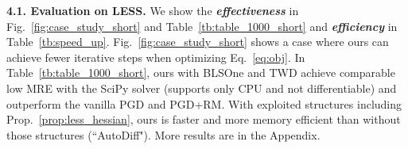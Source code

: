 \documentclass{article}
\newcommand{\textbt}[1]{\textbf{\textit{#1}}}
\theoremstyle{plain}
\theoremstyle{definition}
\theoremstyle{remark}
\begin{document}
\textbf{4.1. Evaluation on LESS.}
We show the \textbt{effectiveness} in Fig.~\ref{fig:case_study_short} and Table~\ref{tb:table_1000_short} and \textbt{efficiency} in Table~\ref{tb:speed_up}.
%
Fig.~\ref{fig:case_study_short} shows a case where ours can achieve fewer iterative steps when optimizing Eq.~\eqref{eq:obj}.
In Table~\ref{tb:table_1000_short}, ours with BLSOne and TWD achieve comparable low MRE with the SciPy solver \cite{scipy} (supports only CPU and not differentiable) and outperform the vanilla PGD and PGD+RM.
With exploited structures including Prop.~\ref{prop:less_hessian}, ours is faster and more memory efficient than without those structures (``AutoDiff").
More results are in the Appendix.

\begin{table}[!ht]
\vspace{-0.8mm}
\centering
\caption{\textit{With 1,000 random data from $\mathcal{N}(0,1)$.
``In" and ``Out" refer to the number of failed cases inner and outer of the sphere respectively.
``Imp." is the number of cases with FPD $\leq$ the SciPy baseline.
See the Appendix for more results.}
}
\label{tb:table_1000_short}
\setlength{\tabcolsep}{1.5pt}
\end{table}
\end{document}
